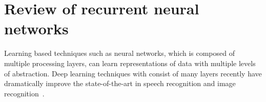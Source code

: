 \section{Review of recurrent neural networks}

Learning based techniques such as neural networks, which is composed of
multiple processing layers, can learn representations of data with
multiple levels of abstraction. Deep learning techniques with consist
of many layers recently have dramatically improve the state-of-the-art
in speech recognition and image recognition~\cite{LeCun:2015dt}.






